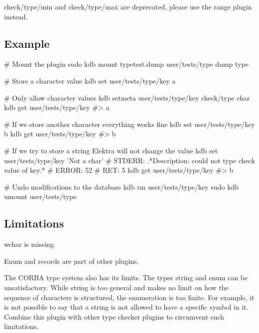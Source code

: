 {\ttfamily check/type/min} and {\ttfamily check/type/max} are deprecated, please use the range plugin instead.

\subsection*{Example}


\begin{DoxyCode}
# Mount the plugin
sudo kdb mount typetest.dump user/tests/type dump type

# Store a character value
kdb set user/tests/type/key a

# Only allow character values
kdb setmeta user/tests/type/key check/type char
kdb get user/tests/type/key
#> a

# If we store another character everything works fine
kdb set user/tests/type/key b
kdb get user/tests/type/key
#> b

# If we try to store a string Elektra will not change the value
kdb set user/tests/type/key 'Not a char'
# STDERR: .*Description: could not type check value of key.*
# ERROR:  52
# RET:    5
kdb get user/tests/type/key
#> b

# Undo modifications to the database
kdb rm user/tests/type/key
sudo kdb umount user/tests/type
\end{DoxyCode}


\subsection*{Limitations}

{\ttfamily wchar} is missing.

Enum and records are part of other plugins.

The {\ttfamily C\+O\+R\+BA} type system also has its limits. The types {\ttfamily string} and {\ttfamily enum} can be unsatisfactory. While string is too general and makes no limit on how the sequence of characters is structured, the enumeration is too finite. For example, it is not possible to say that a string is not allowed to have a specific symbol in it. Combine this plugin with other type checker plugins to circumvent such limitations. 